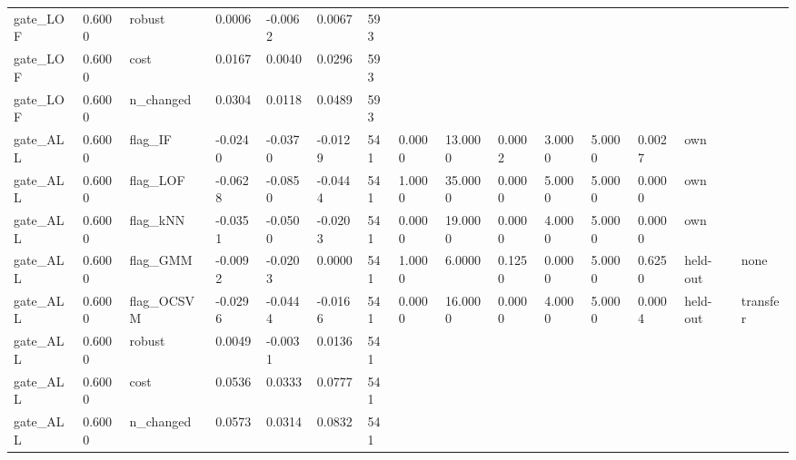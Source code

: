 \begin{table}[t]
\begin{tabular}{lllllllllllllll}
gate\_LOF & 0.6000 & robust & 0.0006 & -0.0062 & 0.0067 & 593 &  &  &  &  &  &  &  &  \\
gate\_LOF & 0.6000 & cost & 0.0167 & 0.0040 & 0.0296 & 593 &  &  &  &  &  &  &  &  \\
gate\_LOF & 0.6000 & n\_changed & 0.0304 & 0.0118 & 0.0489 & 593 &  &  &  &  &  &  &  &  \\
gate\_ALL & 0.6000 & flag\_IF & -0.0240 & -0.0370 & -0.0129 & 541 & 0.0000 & 13.0000 & 0.0002 & 3.0000 & 5.0000 & 0.0027 & own &  \\
gate\_ALL & 0.6000 & flag\_LOF & -0.0628 & -0.0850 & -0.0444 & 541 & 1.0000 & 35.0000 & 0.0000 & 5.0000 & 5.0000 & 0.0000 & own &  \\
gate\_ALL & 0.6000 & flag\_kNN & -0.0351 & -0.0500 & -0.0203 & 541 & 0.0000 & 19.0000 & 0.0000 & 4.0000 & 5.0000 & 0.0000 & own &  \\
gate\_ALL & 0.6000 & flag\_GMM & -0.0092 & -0.0203 & 0.0000 & 541 & 1.0000 & 6.0000 & 0.1250 & 0.0000 & 5.0000 & 0.6250 & held-out & none \\
gate\_ALL & 0.6000 & flag\_OCSVM & -0.0296 & -0.0444 & -0.0166 & 541 & 0.0000 & 16.0000 & 0.0000 & 4.0000 & 5.0000 & 0.0004 & held-out & transfer \\
gate\_ALL & 0.6000 & robust & 0.0049 & -0.0031 & 0.0136 & 541 &  &  &  &  &  &  &  &  \\
gate\_ALL & 0.6000 & cost & 0.0536 & 0.0333 & 0.0777 & 541 &  &  &  &  &  &  &  &  \\
gate\_ALL & 0.6000 & n\_changed & 0.0573 & 0.0314 & 0.0832 & 541 &  &  &  &  &  &  &  &  \\
\bottomrule
\end{tabular}
\end{table}
